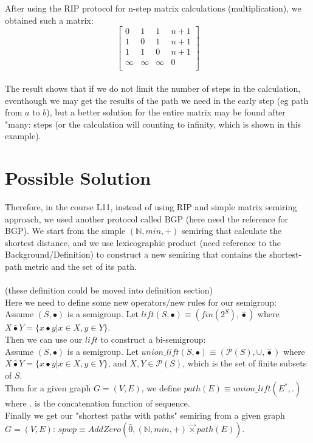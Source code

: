 \documentclass[a4paper,10pt]{article}
\begin{document}
After using the RIP protocol for n-step matrix calculations (multiplication), we obtained such a matrix:
\[
\begin{bmatrix}
    0 & 1 & 1 & n+1 \\
    1 & 0 & 1 & n+1 \\
    1 & 1 & 0 & n+1 \\
    \infty & \infty & \infty & 0 \\
\end{bmatrix}
\]\\
The result shows that if we do not limit the number of steps in the calculation, eventhough we may get the results of the path we need in the early step (eg path from $a$ to $b$), but a better solution for the entire matrix may be found after "many: steps (or the calculation will counting to infinity, which is shown in this example).\\
\section{Possible Solution}
Therefore, in the course L11, instead of using RIP and simple matrix semiring approach, we used another protocol called BGP (here need the reference for BGP). We start from the simple $(\mathbb{N},min,+)$ semiring that calculate the shortest distance, and we use lexicographic product (need reference to the Background/Definition) to construct a new semiring that contains the shortest-path metric and the set of its path.\\\\
(these definition could be moved into definition section)\\
Here we need to define some new operators/new rules for our semigroup:\\
Assume $(S,\bullet)$ is a semigroup. Let $lift(S,\bullet)\equiv (fin(2^S),\hat\bullet)$ where
$X \hat\bullet Y = \{x\bullet y |x\in X,y\in Y\}$.\\
Then we can use our $lift$ to construct a bi-semigroup:\\
Assume $(S,\bullet)$ is a semigroup. Let $union\_lift(S,\bullet)\equiv (\mathcal{P}(S),\cup,\hat\bullet)$ where
$X \hat\bullet Y = \{x\bullet y |x\in X,y\in Y\}$, and $X,Y \in \mathcal{P}(S)$, which is the set of finite subsets of $S$.\\
Then for a given graph $G = (V,E)$, we define $path(E)\equiv union\_lift(E^*,.)$ where . is the concatenation function of sequence.\\
Finally we get our "shortest paths with paths" semiring from a given graph $G = (V,E)$: $spwp \equiv AddZero(\bar0,(\mathbb{N},min,+) \overrightarrow{\times} path(E))$.\\
\end{document}

